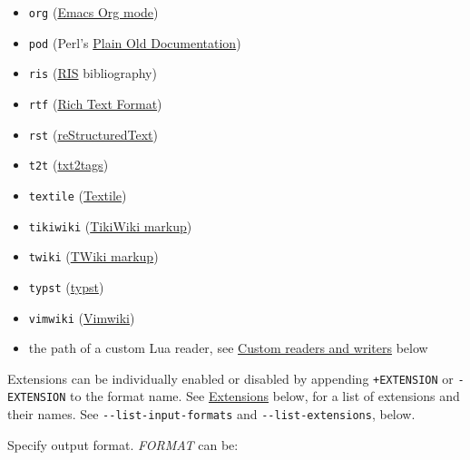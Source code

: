 \documentclass[
  b5paper
]{book}
\begin{document}
\begin{description}
\begin{itemize}
\item
  \texttt{org} (\href{https://orgmode.org}{Emacs Org mode})
\item
  \texttt{pod} (Perl's \href{https://perldoc.perl.org/perlpod}{Plain Old
  Documentation})
\item
  \texttt{ris}
  (\href{https://en.wikipedia.org/wiki/RIS_(file_format)}{RIS}
  bibliography)
\item
  \texttt{rtf}
  (\href{https://en.wikipedia.org/wiki/Rich_Text_Format}{Rich Text
  Format})
\item
  \texttt{rst}
  (\href{https://docutils.sourceforge.io/docs/ref/rst/introduction.html}{reStructuredText})
\item
  \texttt{t2t} (\href{https://txt2tags.org}{txt2tags})
\item
  \texttt{textile} (\href{https://textile-lang.com}{Textile})
\item
  \texttt{tikiwiki}
  (\href{https://doc.tiki.org/Wiki-Syntax-Text\#The_Markup_Language_Wiki-Syntax}{TikiWiki
  markup})
\item
  \texttt{twiki}
  (\href{https://twiki.org/cgi-bin/view/TWiki/TextFormattingRules}{TWiki
  markup})
\item
  \texttt{typst} (\href{https://typst.app}{typst})
\item
  \texttt{vimwiki} (\href{https://vimwiki.github.io}{Vimwiki})
\item
  the path of a custom Lua reader, see
  \hyperref[custom-readers-and-writers]{Custom readers and writers}
  below
\end{itemize}

Extensions can be individually enabled or disabled by appending
\texttt{+EXTENSION} or \texttt{-EXTENSION} to the format name. See
\hyperref[extensions]{Extensions} below, for a list of extensions and
their names. See \texttt{-\/-list-input-formats} and
\texttt{-\/-list-extensions}, below.
\item[\texttt{-t} \emph{FORMAT}, \texttt{-w} \emph{FORMAT},
\texttt{-\/-to=}\emph{FORMAT}, \texttt{-\/-write=}\emph{FORMAT}]
Specify output format. \emph{FORMAT} can be:


\end{description}
\end{document}
